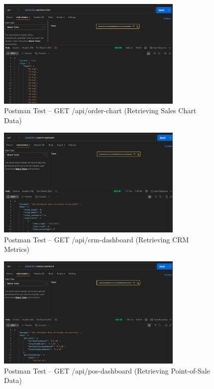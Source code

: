 \begin{figure}[H]
    \centering
    \includegraphics[width=0.8\textwidth]{chapters/chapter 3/hrmFigures/oder_chart.png}
    \caption{Postman Test -- GET /api/order-chart (Retrieving Sales Chart Data)}
    \label{fig:postman_order_chart}
\end{figure}

\begin{figure}[H]
    \centering
    \includegraphics[width=0.8\textwidth]{chapters/chapter 3/hrmFigures/crm-dashboard.png}
    \caption{Postman Test -- GET /api/crm-dashboard (Retrieving CRM Metrics)}
    \label{fig:postman_crm_dashboard}
\end{figure}

\begin{figure}[H]
    \centering
    \includegraphics[width=0.8\textwidth]{chapters/chapter 3/hrmFigures/pos_dashboard.png}
    \caption{Postman Test -- GET /api/pos-dashboard (Retrieving Point-of-Sale Data)}
    \label{fig:postman_pos_dashboard}
\end{figure}

